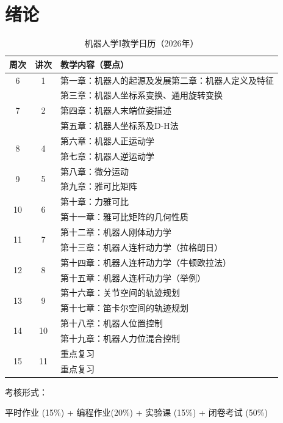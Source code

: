 \section{绪论}
\label{sec:01-introduction}

\begin{table}[htbp]
\centering
\begin{tabular}{@{} c c p{8cm} @{}}
\toprule
周次 & 讲次 & 教学内容（要点） \\
\midrule
6 & 1 & 第一章：机器人的起源及发展\newline 第二章：机器人定义及特征 \\
\midrule
\multirow{3}{*}{7} & \multirow{3}{*}{2} & 第三章：机器人坐标系变换、通用旋转变换 \\
& & 第四章：机器人末端位姿描述 \\
& & 第五章：机器人坐标系及D-H法 \\
\midrule
\multirow{2}{*}{8} & \multirow{2}{*}{4} & 第六章：机器人正运动学 \\
& & 第七章：机器人逆运动学 \\
\midrule
\multirow{2}{*}{9} & \multirow{2}{*}{5} & 第八章：微分运动 \\
& & 第九章：雅可比矩阵 \\
\midrule
\multirow{2}{*}{10} & \multirow{2}{*}{6} & 第十章：力雅可比 \\
& & 第十一章：雅可比矩阵的几何性质 \\
\midrule
\multirow{2}{*}{11} & \multirow{2}{*}{7} & 第十二章：机器人刚体动力学 \\
& & 第十三章：机器人连杆动力学（拉格朗日） \\
\midrule
\multirow{2}{*}{12} & \multirow{2}{*}{8} & 第十四章：机器人连杆动力学（牛顿欧拉法） \\
& & 第十五章：机器人连杆动力学（举例） \\
\midrule
\multirow{2}{*}{13} & \multirow{2}{*}{9} & 第十六章：关节空间的轨迹规划 \\
& & 第十七章：笛卡尔空间的轨迹规划 \\
\midrule
\multirow{2}{*}{14} & \multirow{2}{*}{10} & 第十八章：机器人位置控制 \\
& & 第十九章：机器人力位混合控制 \\
\midrule
\multirow{2}{*}{15} & \multirow{2}{*}{11} & 重点复习 \\
& & 重点复习 \\
\bottomrule
\end{tabular}
\caption{机器人学I教学日历（2026年）}
\end{table}

考核形式：

平时作业 (15\%) + 编程作业(20\%) + 实验课 (15\%) + 闭卷考试 (50\%)
